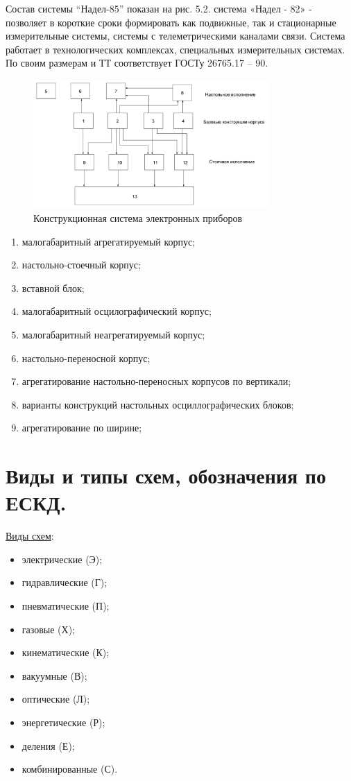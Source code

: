 \documentclass[unicode, 12pt, a4paper, oneside]{article}
\begin{document}
Состав системы “Надел-85” показан на рис. 5.2. система «Надел - 82» - позволяет в короткие сроки формировать как подвижные, так и стационарные измерительные системы, системы с телеметрическими каналами связи. Система работает в технологических комплексах, специальных измерительных системах. По своим размерам и ТТ соответствует ГОСТу 26765.17 – 90.
\begin{figure}[H]
\centering
\includegraphics[width=0.8\textwidth]{63_Sistema.JPG}
\caption{Конструкционная система электронных приборов}
\end{figure}
\begin{center}
\begin{enumerate}
\item малогабаритный агрегатируемый корпус;
\item настольно-стоечный корпус;
\item вставной блок;
\item малогабаритный осцилографический корпус;
\item малогабаритный неагрегатируемый корпус;
\item настольно-переносной корпус;
\item агрегатирование настольно-переносных корпусов по вертикали;
\item варианты конструкций настольных осциллографических блоков;
\item агрегатирование по ширине; 
\end{enumerate}
\end{center}


\section{Виды и типы схем, обозначения по ЕСКД.}
\underline{Виды схем}:
\begin{itemize}
\item электрические (Э);
\item  гидравлические (Г);
\item  пневматические (П);
\item  газовые (Х); 
\item кинематические (К);
\item  вакуумные (В); 
\item оптические (Л);
\item энергетические (Р);
\item  деления (Е);
\item  комбинированные (С).
\end{itemize}
\end{document}
